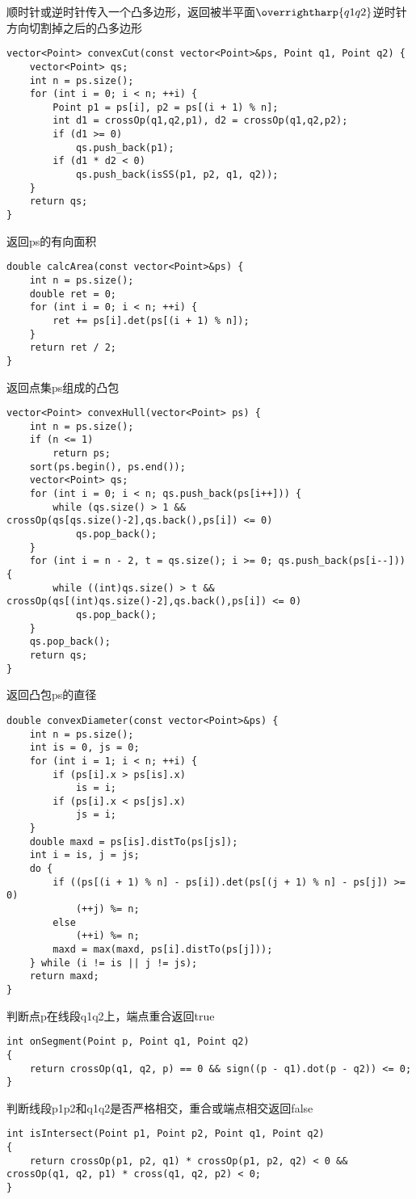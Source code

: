 顺时针或逆时针传入一个凸多边形，返回被半平面$\overrightharp{q1q2}$逆时针方向切割掉之后的凸多边形
\begin{lstlisting}
vector<Point> convexCut(const vector<Point>&ps, Point q1, Point q2) {
	vector<Point> qs;
	int n = ps.size();
	for (int i = 0; i < n; ++i) {
		Point p1 = ps[i], p2 = ps[(i + 1) % n];
		int d1 = crossOp(q1,q2,p1), d2 = crossOp(q1,q2,p2);
		if (d1 >= 0)
			qs.push_back(p1);
		if (d1 * d2 < 0)
			qs.push_back(isSS(p1, p2, q1, q2));
	}
	return qs;
}
\end{lstlisting}
返回ps的有向面积
\begin{lstlisting}
double calcArea(const vector<Point>&ps) {
	int n = ps.size();
	double ret = 0;
	for (int i = 0; i < n; ++i) {
		ret += ps[i].det(ps[(i + 1) % n]);
	}
	return ret / 2;
}
\end{lstlisting}
返回点集ps组成的凸包
\begin{lstlisting}
vector<Point> convexHull(vector<Point> ps) {
	int n = ps.size();
	if (n <= 1)
		return ps;
	sort(ps.begin(), ps.end());
	vector<Point> qs;
	for (int i = 0; i < n; qs.push_back(ps[i++])) {
		while (qs.size() > 1 && crossOp(qs[qs.size()-2],qs.back(),ps[i]) <= 0)
			qs.pop_back();
	}
	for (int i = n - 2, t = qs.size(); i >= 0; qs.push_back(ps[i--])) {
		while ((int)qs.size() > t && crossOp(qs[(int)qs.size()-2],qs.back(),ps[i]) <= 0)
			qs.pop_back();
	}
	qs.pop_back();
	return qs;
}
\end{lstlisting}
返回凸包ps的直径
\begin{lstlisting}
double convexDiameter(const vector<Point>&ps) {
	int n = ps.size();
	int is = 0, js = 0;
	for (int i = 1; i < n; ++i) {
		if (ps[i].x > ps[is].x)
			is = i;
		if (ps[i].x < ps[js].x)
			js = i;
	}
	double maxd = ps[is].distTo(ps[js]);
	int i = is, j = js;
	do {
		if ((ps[(i + 1) % n] - ps[i]).det(ps[(j + 1) % n] - ps[j]) >= 0)
			(++j) %= n;
		else
			(++i) %= n;
		maxd = max(maxd, ps[i].distTo(ps[j]));
	} while (i != is || j != js);
	return maxd;
}
\end{lstlisting}
判断点p在线段q1q2上，端点重合返回true
\begin{lstlisting}
int onSegment(Point p, Point q1, Point q2)
{
	return crossOp(q1, q2, p) == 0 && sign((p - q1).dot(p - q2)) <= 0;
}
\end{lstlisting}
判断线段p1p2和q1q2是否严格相交，重合或端点相交返回false
\begin{lstlisting}
int isIntersect(Point p1, Point p2, Point q1, Point q2)
{
	return crossOp(p1, p2, q1) * crossOp(p1, p2, q2) < 0 && crossOp(q1, q2, p1) * cross(q1, q2, p2) < 0;
}
\end{lstlisting}
